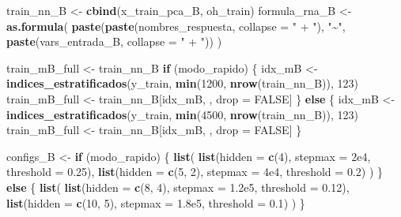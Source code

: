 \documentclass[
]{article}
\newenvironment{Shaded}{\begin{snugshade}}{\end{snugshade}}
\newcommand{\AttributeTok}[1]{\textcolor[rgb]{0.13,0.29,0.53}{#1}}
\newcommand{\ConstantTok}[1]{\textcolor[rgb]{0.56,0.35,0.01}{#1}}
\newcommand{\ControlFlowTok}[1]{\textcolor[rgb]{0.13,0.29,0.53}{\textbf{#1}}}
\newcommand{\DecValTok}[1]{\textcolor[rgb]{0.00,0.00,0.81}{#1}}
\newcommand{\FloatTok}[1]{\textcolor[rgb]{0.00,0.00,0.81}{#1}}
\newcommand{\FunctionTok}[1]{\textcolor[rgb]{0.13,0.29,0.53}{\textbf{#1}}}
\newcommand{\NormalTok}[1]{#1}
\newcommand{\OtherTok}[1]{\textcolor[rgb]{0.56,0.35,0.01}{#1}}
\newcommand{\StringTok}[1]{\textcolor[rgb]{0.31,0.60,0.02}{#1}}
\begin{document}
\begin{Shaded}
\begin{Highlighting}[]
\NormalTok{  train\_nn\_B }\OtherTok{\textless{}{-}} \FunctionTok{cbind}\NormalTok{(x\_train\_pca\_B, oh\_train)}
\NormalTok{  formula\_rna\_B }\OtherTok{\textless{}{-}} \FunctionTok{as.formula}\NormalTok{(}
    \FunctionTok{paste}\NormalTok{(}\FunctionTok{paste}\NormalTok{(nombres\_respuesta, }\AttributeTok{collapse =} \StringTok{" + "}\NormalTok{), }\StringTok{"\textasciitilde{}"}\NormalTok{, }\FunctionTok{paste}\NormalTok{(vars\_entrada\_B, }\AttributeTok{collapse =} \StringTok{" + "}\NormalTok{))}
\NormalTok{  )}

\NormalTok{  train\_mB\_full }\OtherTok{\textless{}{-}}\NormalTok{ train\_nn\_B}
  \ControlFlowTok{if}\NormalTok{ (modo\_rapido) \{}
\NormalTok{    idx\_mB }\OtherTok{\textless{}{-}} \FunctionTok{indices\_estratificados}\NormalTok{(y\_train, }\FunctionTok{min}\NormalTok{(}\DecValTok{1200}\NormalTok{, }\FunctionTok{nrow}\NormalTok{(train\_nn\_B)), }\DecValTok{123}\NormalTok{)}
\NormalTok{    train\_mB\_full }\OtherTok{\textless{}{-}}\NormalTok{ train\_nn\_B[idx\_mB, , drop }\OtherTok{=} \ConstantTok{FALSE}\NormalTok{]}
\NormalTok{  \} }\ControlFlowTok{else}\NormalTok{ \{}
\NormalTok{    idx\_mB }\OtherTok{\textless{}{-}} \FunctionTok{indices\_estratificados}\NormalTok{(y\_train, }\FunctionTok{min}\NormalTok{(}\DecValTok{4500}\NormalTok{, }\FunctionTok{nrow}\NormalTok{(train\_nn\_B)), }\DecValTok{123}\NormalTok{)}
\NormalTok{    train\_mB\_full }\OtherTok{\textless{}{-}}\NormalTok{ train\_nn\_B[idx\_mB, , drop }\OtherTok{=} \ConstantTok{FALSE}\NormalTok{]}
\NormalTok{  \}}

\NormalTok{  configs\_B }\OtherTok{\textless{}{-}} \ControlFlowTok{if}\NormalTok{ (modo\_rapido) \{}
    \FunctionTok{list}\NormalTok{(}
      \FunctionTok{list}\NormalTok{(}\AttributeTok{hidden =} \FunctionTok{c}\NormalTok{(}\DecValTok{4}\NormalTok{), }\AttributeTok{stepmax =} \FloatTok{2e4}\NormalTok{, }\AttributeTok{threshold =} \FloatTok{0.25}\NormalTok{),}
      \FunctionTok{list}\NormalTok{(}\AttributeTok{hidden =} \FunctionTok{c}\NormalTok{(}\DecValTok{5}\NormalTok{, }\DecValTok{2}\NormalTok{), }\AttributeTok{stepmax =} \FloatTok{4e4}\NormalTok{, }\AttributeTok{threshold =} \FloatTok{0.2}\NormalTok{)}
\NormalTok{    )}
\NormalTok{  \} }\ControlFlowTok{else}\NormalTok{ \{}
    \FunctionTok{list}\NormalTok{(}
      \FunctionTok{list}\NormalTok{(}\AttributeTok{hidden =} \FunctionTok{c}\NormalTok{(}\DecValTok{8}\NormalTok{, }\DecValTok{4}\NormalTok{), }\AttributeTok{stepmax =} \FloatTok{1.2e5}\NormalTok{, }\AttributeTok{threshold =} \FloatTok{0.12}\NormalTok{),}
      \FunctionTok{list}\NormalTok{(}\AttributeTok{hidden =} \FunctionTok{c}\NormalTok{(}\DecValTok{10}\NormalTok{, }\DecValTok{5}\NormalTok{), }\AttributeTok{stepmax =} \FloatTok{1.8e5}\NormalTok{, }\AttributeTok{threshold =} \FloatTok{0.1}\NormalTok{)}
\NormalTok{    )}
\NormalTok{  \}}


\end{Highlighting}
\end{Shaded}
\end{document}
